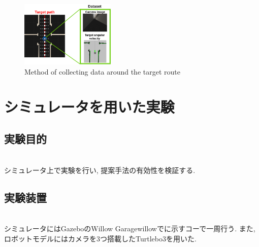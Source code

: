 \documentclass[10pt]{ujarticle}
\begin{document}
    \begin{figure}[h]
        \centering
        \includegraphics[width=0.4\textwidth]{fig/collect-data2.png}
        \caption{Method of collecting data around the target route}
        \label{Fig:collect}
    \end{figure}

    \section{シミュレータを用いた実験}%
    \subsection{実験目的}\mbox{}\\
    シミュレータ上で実験を行い, 提案手法の有効性を検証する. 

    \subsection{実験装置}\mbox{}\\
    シミュレータにはGazebo\cite{gazebo}のWillow Garage{willow}でに示すコーで一周行う. また, ロボットモデルにはカメラを3つ搭載したTurtlebo3\cite{turtlebot3}を用いた. 
\end{document}
